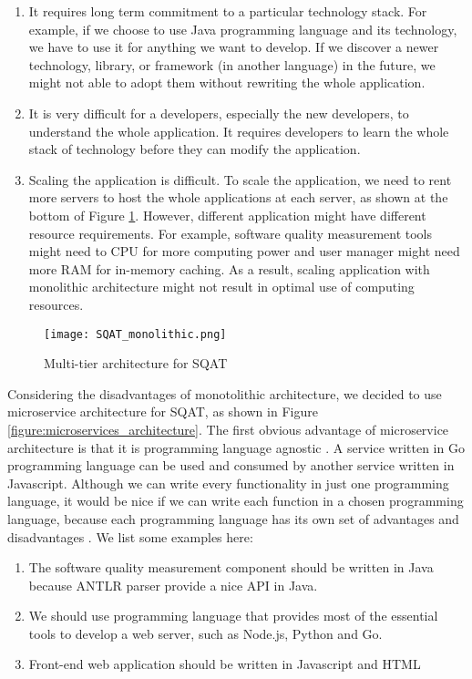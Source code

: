 \begin{enumerate}
    \item It requires long term commitment to a particular technology stack. For example, if we choose to use Java programming language and its technology, we have to use it for anything we want to develop. If we discover a newer technology, library, or framework (in another language) in the future, we might not able to adopt them without rewriting the whole application. 
    \item It is very difficult for a developers, especially the new developers, to understand the whole application. It requires developers to learn the whole stack of technology before they can modify the application. 
    \item Scaling the application is difficult. To scale the application, we need to rent more servers to host the whole applications at each server, as shown at the bottom of Figure \ref{figure:SQAT_monolithic}. However, different application might have different resource requirements. For example, software quality measurement tools might need to CPU for more computing power and user manager might need more RAM for in-memory caching. As a result, scaling application with monolithic architecture might not result in optimal use of computing resources.
\end{enumerate}

\begin{figure}[t]
    \centering
    \texttt{[image: SQAT\_monolithic.png]}
    \caption{Multi-tier architecture for SQAT}
    \label{figure:SQAT_monolithic}
\end{figure}

Considering the disadvantages of monotolithic architecture, we decided to use microservice architecture for SQAT, as shown in Figure \ref{figure:microservices_architecture}. The first obvious advantage of microservice architecture is that it is programming language agnostic \cite[]{martinfowler2015}. A service written in Go programming language can be used and consumed by another service written in Javascript. Although we can write every functionality in just one programming language, it would be nice if we can write each function in a chosen programming language, because each programming language has its own set of advantages and disadvantages \cite[]{prechelt2000empirical}. We list some examples here:

\begin{enumerate}
    \item The software quality measurement component should be written in Java because ANTLR parser provide a nice API in Java.
    \item We should use programming language that provides most of the essential tools to develop a web server, such as Node.js, Python and Go. 
    \item Front-end web application should be written in Javascript and HTML
\end{enumerate}

